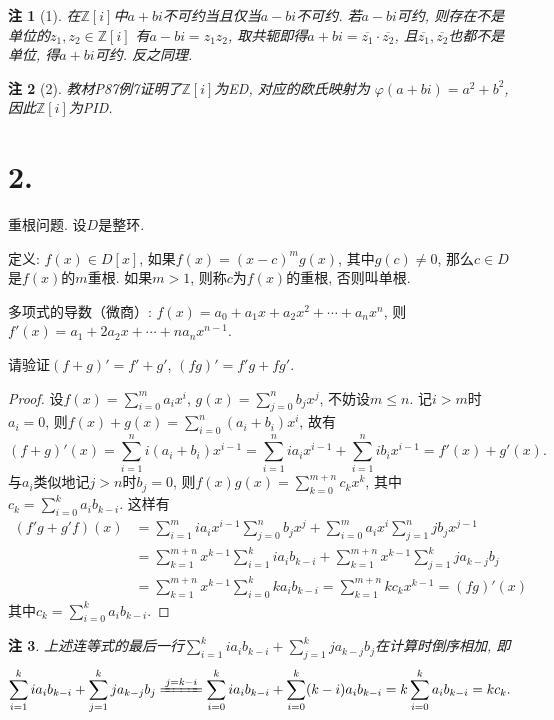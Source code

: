\documentclass[12pt, a4paper, fontset=windows]{ctexart}
\newcommand{\Z}{\mathbb{Z}}
\newcommand{\cl}[1]{\overline{#1}} %
\newcommand{\kh}[1]{（{#1}）} %
\newtheorem*{remark}{注}
\begin{document}
\begin{remark}[1]
在$\Z[i]$中$a+bi$不可约当且仅当$a-bi$不可约. 
若$a-bi$可约, 则存在不是单位的$z_1,z_2\in\Z[i]$
有$a-bi=z_1z_2$, 取共轭即得$a+bi=\cl{z_1}\cdot\cl{z_2}$, 
且$\cl{z_1},\cl{z_2}$也都不是单位, 得$a+bi$可约. 反之同理. 
\end{remark}

\begin{remark}[2]
教材P87例7{\rm\cite{jsds}}证明了$\Z[i]$为ED, 对应的欧氏映射为
$\varphi(a+bi)=a^2+b^2$, 因此$\Z[i]$为PID. 
\end{remark}

\section*{2.}
\label{dbl-rt}

重根问题. 设$D$是整环. 

定义: $f(x)\in D[x]$, 如果$f(x)=(x-c)^mg(x)$, 
其中$g(c)\ne 0$, 那么$c\in D$是$f(x)$的$m$重根. 如果$m>1$, 
则称$c$为$f(x)$的重根, 否则叫单根. 

多项式的导数\kh{微商}: $f(x)=a_0+a_1x+a_2x^2+\cdots+a_nx^n$, 
则$f'(x)=a_1+2a_2x+\cdots+na_nx^{n-1}$. 

请验证$(f+g)'=f'+g'$, $(fg)'=f'g+fg'$. 

\begin{proof}
设$f(x)=\sum^m_{i=0}a_ix^i$, $g(x)=\sum^n_{j=0}b_jx^j$, 
不妨设$m\le n$. 记$i>m$时$a_i=0$, 
则$f(x)+g(x)=\sum^n_{i=0}(a_i+b_i)x^i$, 故有
\[(f+g)'(x)=\sum^n_{i=1}i(a_i+b_i)x^{i-1}=\sum^n_{i=1}ia_ix^{i-1}+\sum^n_{i=1}ib_ix^{i-1}=f'(x)+g'(x). \]
与$a_i$类似地记$j>n$时$b_j=0$, 则$f(x)g(x)=\sum^{m+n}_{k=0}c_kx^k$, 
其中$c_k=\sum^k_{i=0}a_ib_{k-i}$. 这样有
\begin{align*}
(f'g+g'f)(x)&=\sum^m_{i=1}ia_ix^{i-1}\sum^n_{j=0}b_jx^j+\sum^m_{i=0}a_ix^i\sum^n_{j=1}jb_jx^{j-1}\\
&=\sum^{m+n}_{k=1}x^{k-1}\sum^k_{i=1}ia_ib_{k-i}+\sum^{m+n}_{k=1}x^{k-1}\sum^k_{j=1}ja_{k-j}b_j\\
&=\sum^{m+n}_{k=1}x^{k-1}\sum^k_{i=0}ka_ib_{k-i}=\sum^{m+n}_{k=1}kc_kx^{k-1}=(fg)'(x)
\end{align*}
其中$c_k=\sum^k_{i=0}a_ib_{k-i}$. 
\end{proof}

\begin{remark}
上述连等式的最后一行$\sum^k_{i=1}ia_ib_{k-i}+\sum^k_{j=1}ja_{k-j}b_j$在计算时倒序相加, 即
\[\sum^k_{i=1}ia_ib_{k-i}+\sum^k_{j=1}ja_{k-j}b_j\xlongequal{j=k-i}\sum^k_{i=0}ia_ib_{k-i}+\sum^k_{i=0}(k-i)a_ib_{k-i}=k\sum^k_{i=0}a_ib_{k-i}=kc_k. \]
\end{remark}
\end{document}
